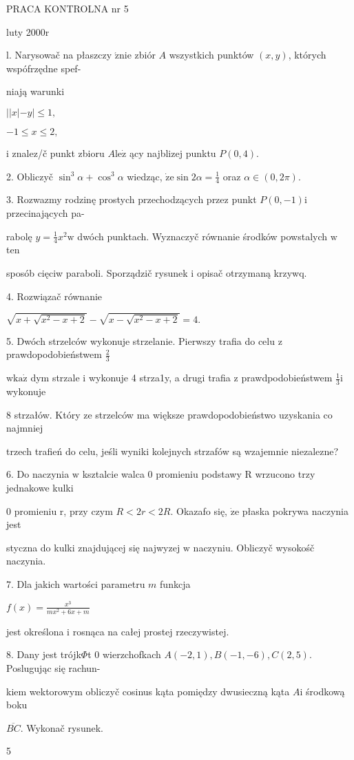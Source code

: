 \documentclass[a4paper,12pt]{article}
\begin{document}
PRACA KONTROLNA nr 5

luty 2000r

l. Narysowač na płaszczy $\acute{\mathrm{z}}\mathrm{n}\mathrm{i}\mathrm{e}$ zbiór $A$ wszystkich punktów $(x,y)$, których wspófrzędne spef-

niają warunki

$||x| -y| \leq 1,$

$-1\leq x\leq 2,$

$\mathrm{i}$ znalez/č punkt zbioru $A\mathrm{l}\mathrm{e}\dot{\mathrm{z}}$ ący najblizej punktu $P(0,4).$

2. Obliczyč $\sin^{3}\alpha+\cos^{3}\alpha$ wiedząc, $\displaystyle \dot{\mathrm{z}}\mathrm{e}\sin 2\alpha=\frac{1}{4}$ oraz $\alpha\in (0,2\pi).$

3. Rozwazmy rodzinę prostych przechodzących przez punkt $P(0,-1) \mathrm{i}$ przecinających pa-

rabolę $y = \displaystyle \frac{1}{4}x^{2} \mathrm{w}$ dwóch punktach. Wyznaczyč równanie środków powstalych $\mathrm{w}$ ten

sposób cięciw paraboli. Sporządzič rysunek $\mathrm{i}$ opisač otrzymaną krzywq.

4. Rozwiązač równanie

$\sqrt{x+\sqrt{x^{2}-x+2}}-\sqrt{x-\sqrt{x^{2}-x+2}}=4.$

5. Dwóch strzelców wykonuje strzelanie. Pierwszy trafia do celu $\mathrm{z}$ prawdopodobieństwem $\displaystyle \frac{2}{3}$

$\mathrm{w}\mathrm{k}\mathrm{a}\dot{\mathrm{z}}$ dym strzale $\mathrm{i}$ wykonuje 4 strza1y, a drugi trafia $\mathrm{z}$ prawdpodobieństwem $\displaystyle \frac{1}{3}\mathrm{i}$ wykonuje

8 strzałów. Który ze strzelców ma większe prawdopodobieństwo uzyskania co najmniej

trzech trafień do celu, jeśli wyniki kolejnych strzafów są wzajemnie niezalezne?

6. Do naczynia $\mathrm{w}$ ksztalcie walca $0$ promieniu podstawy $\mathrm{R}$ wrzucono trzy jednakowe kulki

$0$ promieniu $\mathrm{r}$, przy czym $R< 2r < 2R$. Okazafo się, $\dot{\mathrm{z}}\mathrm{e}$ płaska pokrywa naczynia jest

styczna do kulki znajdującej się najwyzej $\mathrm{w}$ naczyniu. Obliczyč wysokośč naczynia.

7. Dla jakich wartości parametru $m$ funkcja

$f(x)=\displaystyle \frac{x^{3}}{mx^{2}+6x+m}$

jest określona $\mathrm{i}$ rosnąca na całej prostej rzeczywistej.

8. Dany jest trójk$\Phi$t $0$ wierzchofkach $A(-2,1), B(-1,-6), C(2,5)$. Poslugując się rachun-

kiem wektorowym obliczyč cosinus kąta pomiędzy dwusieczną kąta $A\mathrm{i}$ środkową boku

$\overline{BC}$. Wykonač rysunek.

5
\end{document}
